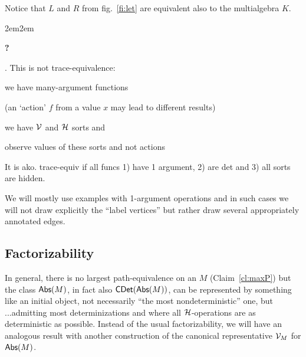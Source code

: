 \documentclass[10pt]{article}
\newcounter{COMMENT}
\def\margCom{2em}
\newenvironment{comm}{\refstepcounter{COMMENT}\begin{list}{\normalsize}
  {\leftmargin\margCom \rightmargin\margCom}}{\end{list}}
\newcommand{\com}[1]{\begin{comm}\item[{\large\bf ?\ }] 
   {\small\bf{\theCOMMENT.#1}} \dotfill{{\large\bf ?}} \end{comm}}
\newcommand{\vv}[1]{{\cal V}_{#1}}
\newcommand{\vm}{\vv M}
\newcommand{\Abs}[1]{\mbox{\sf Abs}(#1)}
\begin{document}
%
Notice that $L$ and $R$ from fig.~\ref{fi:let} are equivalent also to the 
multialgebra $K$.
%
\com{
This is not trace-equivalence:
\begin{enum}
\item we have many-argument functions
\item (an `action' $f$ from a value $x$ may lead to different results)
\item we have ${\cal V}$ and ${\cal H}$ sorts and 
\item observe values of these sorts and not actions
\end{enum}
It is ako. trace-equiv if all funcs 1) have 1 argument, 2) are det
and 3) all sorts are hidden.
}
We will mostly use examples with 1-argument operations and in such cases we 
will not draw explicitly the ``label vertices'' but rather draw several 
appropriately annotated edges.

\subsection{Factorizability}
In general, there is no largest path-equivalence on an $M$ (Claim~\ref{cl:maxP})
but the class  $\Abs M$, in fact also
$\CDet(\Abs M)$, can be represented by
something like an initial object,
not necessarily ``the most nondeterministic'' one, but ...admitting most 
determinizations and where all ${\cal H}$-operations are as deterministic as 
possible.
Instead of the usual factorizability, we will have an analogous result
with another construction of the canonical representative $\vm$ for
$\Abs M$.
\end{document}

